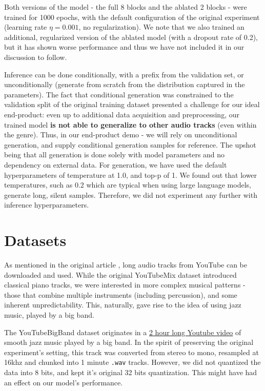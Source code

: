 \documentclass[12pt]{article}
\begin{document}
Both versions of the model - the full 8 blocks and the ablated 2 blocks - were trained for 1000 epochs, with the default configuration of the original experiment (learning rate $\eta = 0.001$, no regularization). We note that we also trained an additional, regularized version of the ablated model (with a dropout rate of 0.2), but it has shown worse performance and thus we have not included it in our discussion to follow.

Inference can be done conditionally, with a prefix from the validation set, or unconditionally (generate from scratch from the distribution captured in the parameters). The fact that conditional generation was constrained to the validation split of the original training dataset presented a challenge for our ideal end-product: even up to additional data acquisition and preprocessing, our trained model \textbf{is not able to generalize to other audio tracks} (even within the genre). 
Thus, in our end-product demo - we will rely on unconditional generation, and supply conditional generation samples for reference. The upshot being that all generation is done solely with model parameters and no dependency on external data. For generation, we have used the default hyperparameters of temperature at 1.0, and top-p of 1. We found out that lower temperatures, such as 0.2 which are typical when using large language models, generate long, silent samples. Therefore, we did not experiment any further with inference hyperparameters.

\section{Datasets}
As mentioned in the original article \cite{goel2022itsrawaudiogeneration}, long audio tracks from YouTube can be downloaded and used. While the original YouTubeMix dataset introduced classical piano tracks, we were interested in more complex musical patterns - those that combine multiple instruments (including percussion), and some inherent unpredictability. This, naturally, gave rise to the idea of using jazz music, played by a big band.

The YouTubeBigBand dataset \cite{bigband} originates in a \href{https://www.youtube.com/watch?v=I4KAKqF4mjE}{2 hour long Youtube video} of smooth jazz music played by a big band. In the spirit of preserving the original experiment's setting, this track was converted from stereo to mono, resampled at 16khz and chunked into 1 minute \texttt{.wav} tracks. However, we did not quantized the data into 8 bits, and kept it's original 32 bits quantization. This might have had an effect on our model's performance.
\end{document}
